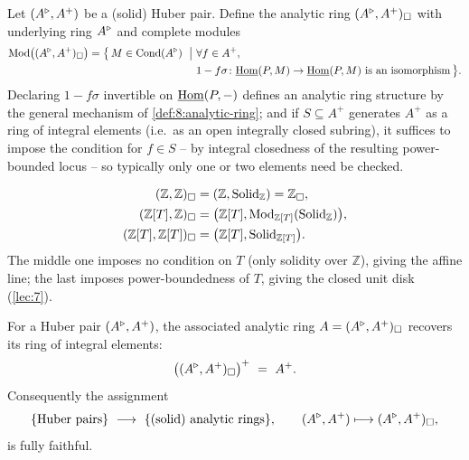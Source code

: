 \begin{definition}
\label{def:8:mod-from-huber-pair}
Let $(A^{\triangleright},A^{+})$ be a (solid) Huber pair. Define the analytic ring
$(A^{\triangleright},A^{+})_{\square}$ with underlying ring $A^{\triangleright}$ and complete modules
\begin{equation*}
\begin{aligned}
\Mod\bigl((\ur A,A^{+})_{\solid}\bigr)=\bigl\{\,M\in\Cond(\ur A)\ \bigm|\ &
\forall f\in A^{+},\\
&1-f\sigma\colon\iHom(P,M)\to\iHom(P,M)\ \text{is an isomorphism}\,\bigr\}.
\end{aligned}
\end{equation*}
Declaring $1-f\sigma$ invertible on $\underline{\operatorname{Hom}}(P,-)$ defines an analytic ring
structure by the general mechanism of \cref{def:8:analytic-ring}; and if
$S\subseteq A^{+}$ generates $A^{+}$ as a ring of integral elements (i.e.\ as an
open integrally closed subring), it suffices to impose the condition for $f\in S$
-- by integral closedness of the resulting power-bounded locus -- so typically
only one or two elements need be checked.
\end{definition}

\begin{example}
\label{ex:8:three-structures}
\begin{align}
\label{eq:8:three-structures}
(\mathbb{Z},\mathbb{Z})_{\square}&=(\mathbb{Z},\mathrm{Solid}_{\mathbb{Z}})=\mathbb{Z}_{\square},\notag\\
(\mathbb{Z}[T],\mathbb{Z})_{\square}&=\bigl(\mathbb{Z}[T],\operatorname{Mod}_{\mathbb{Z}[T]}(\mathrm{Solid}_{\mathbb{Z}})\bigr),\\
(\mathbb{Z}[T],\mathbb{Z}[T])_{\square}&=\bigl(\mathbb{Z}[T],\mathrm{Solid}_{\mathbb{Z}[T]}\bigr).\notag
\end{align}
The middle one imposes no condition on $T$ (only solidity over $\mathbb{Z}$),
giving the affine line; the last imposes power-boundedness of $T$, giving the
closed unit disk (\cref{lec:7}).
\end{example}

\begin{proposition}
\label{prop:8:huber-fully-faithful}
For a Huber pair $(A^{\triangleright},A^{+})$, the associated analytic ring
$A=(A^{\triangleright},A^{+})_{\square}$ recovers its ring of integral elements:
\begin{equation*}
\bigl((A^{\triangleright},A^{+})_{\square}\bigr)^{+}\ =\ A^{+}.
\end{equation*}
Consequently the assignment
\begin{equation*}
\{\text{Huber pairs}\}\ \longrightarrow\ \{\text{(solid) analytic rings}\},
\qquad (\ur A,A^{+})\longmapsto(\ur A,A^{+})_{\solid},
\end{equation*}
is fully faithful.
\end{proposition}

